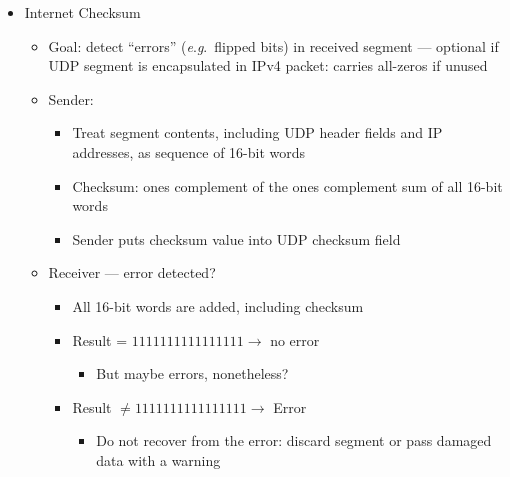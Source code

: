 \begin{itemize}
\begin{itemize}
\begin{itemize}
        \end{itemize}

    \end{itemize}

  \item Internet Checksum

    \begin{itemize}

      \item Goal: detect ``errors'' (\textit{e}.\textit{g}.\ flipped bits) in received segment —  optional if UDP segment is encapsulated in IPv4 packet: carries all-zeros if unused

      \item Sender:

        \begin{itemize}

          \item Treat segment contents, including UDP header fields and IP addresses, as sequence of 16-bit words

          \item Checksum: ones complement of the ones complement sum of all 16-bit words

          \item Sender puts checksum value into UDP checksum field

        \end{itemize}

      \item Receiver — error detected?

        \begin{itemize}

          \item All 16-bit words are added, including checksum

          \item Result = $1111111111111111\to$ no error 

            \begin{itemize}

              \item But maybe errors, nonetheless?

            \end{itemize}

          \item Result $\neq1111111111111111\to$ Error

            \begin{itemize}

              \item Do not recover from the error: discard segment or pass damaged data with a warning


\end{itemize}
\end{itemize}
\end{itemize}
\end{itemize}
